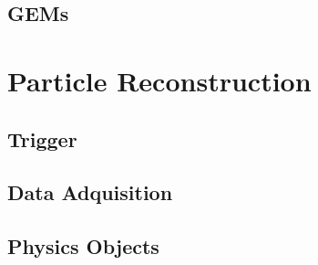 \subsection{GEMs}
\label{subsec:GEMs}

\section{Particle Reconstruction}
\label{sec:ParticleReconstruction}

\subsection{Trigger}
\label{subsec:Trigger}

\subsection{Data Adquisition}
\label{subsec:DAQ}

\subsection{Physics Objects}
\label{subsec:PhysicsObjects}

